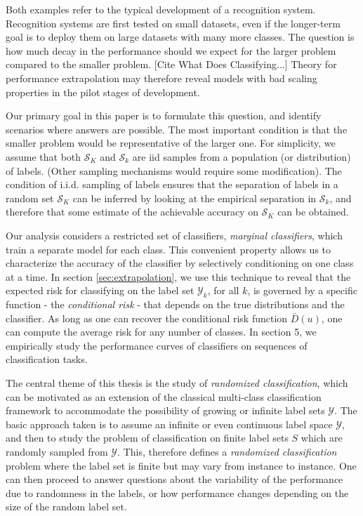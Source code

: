 \documentclass[12pt]{article}
\begin{document}
Both examples refer to the typical development of a recognition system. 
Recognition systems are first tested on small datasets, even 
if the longer-term goal is to deploy them on large datasets with many more classes.
The question is how much decay in the performance should we expect for the larger problem compared to the smaller problem. [Cite What Does Classifying...]
Theory for performance extrapolation may therefore
reveal models with bad scaling properties in the pilot stages of
development.

Our primary goal in this paper is to formulate this question, and
identify scenarios where answers are possible. 
The most important condition is that the smaller problem would be 
representative of the larger one. For simplicity, we
assume that both $\mathcal{S}_K$ and $\mathcal{S}_k$ are iid samples
from a population (or distribution) of labels. (Other sampling 
mechanisms would require some modification). 
The condition of i.i.d. sampling of labels ensures that the
separation of labels in a random set $\mathcal{S}_K$ can be inferred by
looking at the empirical separation in $\mathcal{S}_k$, and
therefore that some estimate of the achievable accuracy on
$\mathcal{S}_K$ can be obtained.

Our analysis considers a restricted set of classifiers,
\emph{marginal classifiers}, which train a separate model for each class. 
This convenient property allows us to
characterize the accuracy of the classifier by selectively
conditioning on one class at a time.  In section \ref{sec:extrapolation}, we use this
technique to reveal that the expected risk for classifying on the
label set $\mathcal{Y}_k$, for all $k$, is governed by a
specific function - the \emph{conditional risk} -  
that depends on the true distributions and the classifier. 
As long as one can recover the conditional risk
function $\bar{D}(u)$, one can compute the average risk for any number
of classes. 
  In section 5, we
empirically study the performance curves of classifiers on sequences
of classification tasks. 



The central theme of this thesis is the study of \emph{randomized
  classification}, which can be motivated as an extension of the
classical multi-class classification framework to accommodate the
possibility of growing or infinite label sets $\mathcal{Y}$. The basic
approach taken is to assume an infinite or even continuous label space
$\mathcal{Y}$, and then to study the problem of classification on
finite label sets $S$ which are randomly sampled from $\mathcal{Y}.$
This, therefore defines a \emph{randomized classification} problem
where the label set is finite but may vary from instance to instance.
One can then proceed to answer questions about the variability of the
performance due to randomness in the labels, or how performance
changes depending on the size of the random label set.
\end{document}
